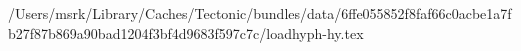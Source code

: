 /Users/msrk/Library/Caches/Tectonic/bundles/data/6ffe055852f8faf66c0acbe1a7fb27f87b869a90bad1204f3bf4d9683f597c7c/loadhyph-hy.tex